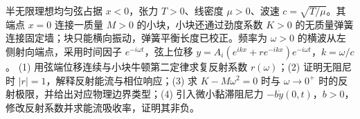 半无限理想均匀弦占据 \(x<0\)，张力 \(T>0\)、线密度 \(\mu>0\)、波速 \(c=\sqrt{T/\mu}\)。其端点 \(x=0\) 连接一质量 \(M>0\) 的小块，小块还通过劲度系数 \(K>0\) 的无质量弹簧连接固定墙；块只能横向振动，弹簧平衡长度已校正。频率为 \(\omega>0\) 的横波从左侧射向端点，采用时间因子 \(e^{-i\omega t}\)，弦上位移 \(y=A_i(e^{ikx}+r e^{-ikx})e^{-i\omega t}\)，\(k=\omega/c\)。
(1) 用弦端位移连续与小块牛顿第二定律求复反射系数 \(r(\omega)\)；(2) 证明无阻尼时 \(|r|=1\)，解释反射能流与相位响应；(3) 求 \(K-M\omega^2=0\) 时与 \(\omega\to0^+\) 时的反射极限，并给出对应物理边界类型；(4) 引入微小黏滞阻尼力 \(-b\dot y(0,t)\)，\(b>0\)，修改反射系数并求能流吸收率，证明其非负。

